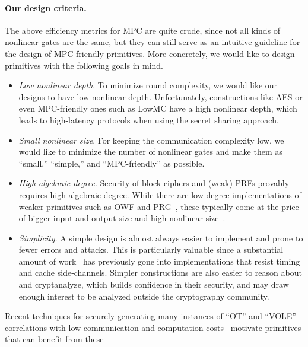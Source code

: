\paragraph{Our design criteria.}  The above efficiency metrics for MPC are quite crude, since not all kinds of nonlinear gates are the same, but they can still serve as an intuitive guideline for the design of MPC-friendly primitives. More concretely, we would like to design primitives with the following goals in mind.

\begin{itemize}[itemsep=1ex]
    \item \textit{Low nonlinear depth}. To minimize round complexity, we would like our designs to have low nonlinear depth. Unfortunately, constructions like AES or even MPC-friendly ones such as LowMC have a high nonlinear depth, which leads to high-latency protocols when using the secret sharing approach.
    
\item \textit{Small nonlinear size}.
 For keeping the communication complexity low, we would like to minimize the number of nonlinear gates and make them as ``small,'' ``simple,'' and ``MPC-friendly'' as possible. 

\item \textit{High algebraic degree}.
Security of block ciphers and (weak) PRFs provably requires high algebraic degree. While there are low-degree implementations of weaker primitives such as OWF and PRG~\cite{MQref,Goldreich,AIK05}, these typically come at the price of bigger input and output size and high nonlinear size~\cite{AsiacryptCouteau}.
    
    \item \textit{Simplicity}.  A simple design is almost always easier to implement and prone to fewer errors and attacks. This is particularly valuable since a substantial amount of work~\cite{?} has previously gone into implementations that resist timing and cache side-channels. Simpler constructions are also easier to reason about and cryptanalyze, which builds confidence in their security, and may draw enough interest to be analyzed outside the cryptography community.
\end{itemize}

\iffalse     
    Recent techniques for securely generating many instances of ``OT'' and ``VOLE'' correlations  with low communication and computation costs~\cite{BCGI18,BCGKIS19,more} motivate primitives that can benefit from these
    
